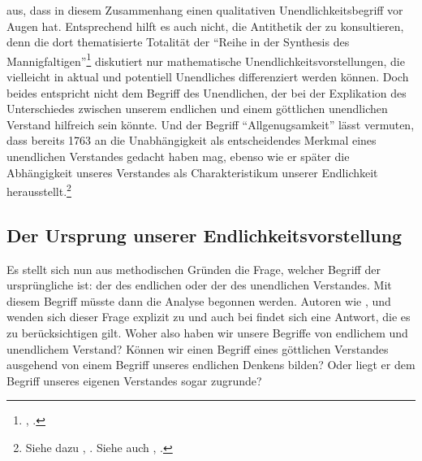 aus, dass  in diesem Zusammenhang einen qualitativen
Unendlichkeitsbegriff vor Augen hat. Entsprechend hilft es auch nicht, die
Antithetik der  zu konsultieren, denn die dort
thematisierte Totalität der \enquote{Reihe in der Synthesis des
Mannigfaltigen}\footnote{\cite[][B 442]{Kant:KritikderreinenVernunft2003},
\cite[][III: 286.37]{Kant:GesammelteWerke1900ff.}.} diskutiert nur mathematische
Unendlichkeitsvorstellungen, die vielleicht in aktual und potentiell Unendliches
differenziert werden können. Doch beides entspricht nicht dem Begriff des
Unendlichen, der bei der Explikation des Unterschiedes zwischen unserem
endlichen und einem göttlichen unendlichen Verstand hilfreich sein
könnte. Und der Begriff \enquote{Allgenugsamkeit} lässt vermuten, dass
 bereits 1763 an die Unabhängigkeit als entscheidendes
Merkmal eines unendlichen Verstandes gedacht haben mag, ebenso wie er später die
Abhängigkeit unseres Verstandes als Charakteristikum unserer Endlichkeit
herausstellt.\footnote{Siehe dazu \cite[][B
72]{Kant:KritikderreinenVernunft2003}, \cite[][III:
72.29--73.4]{Kant:GesammelteWerke1900ff.}. Siehe auch
\cite[][\S~10]{Kant:Demundisensibilisatqueintelligibilisformaetprincipiis1968},
\cite[][II: 396.19--397.4]{Kant:GesammelteWerke1900ff.}.}

\subsection{Der Ursprung unserer Endlichkeitsvorstellung}
Es stellt sich nun aus methodischen Gründen die Frage, welcher Begriff der
ursprüngliche ist: der des endlichen oder der des unendlichen Verstandes. Mit
diesem Begriff müsste dann die Analyse begonnen werden. Autoren wie
, 
und  wenden sich dieser Frage
explizit zu und auch bei  findet sich eine Antwort, die es
zu berücksichtigen gilt. Woher also haben wir unsere Begriffe von endlichem und unendlichem Verstand?
Können wir einen Begriff eines göttlichen Verstandes ausgehend von einem Begriff unseres endlichen
Denkens bilden? Oder liegt er dem Begriff unseres eigenen Verstandes sogar
zugrunde?


